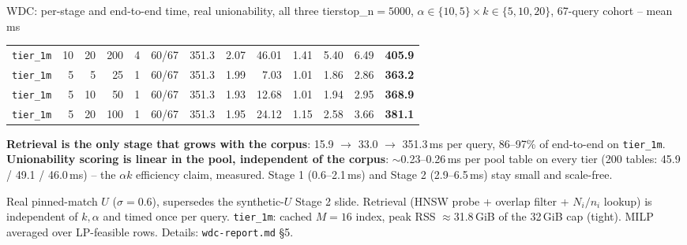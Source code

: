 \documentclass[aspectratio=169,10pt]{beamer}
\newcommand{\highlight}[1]{{\color{Cat1}\bfseries #1}}
\begin{document}
\begin{frame}{WDC: per-stage and end-to-end time, real unionability, all three tiers}{top\_n$=5000$, $\alpha\in\{10,5\}\times k\in\{5,10,20\}$, 67-query cohort -- mean ms}
\begin{center}
\begin{tabular}{lrrrrrrrrrrrr}
\texttt{tier\_1m} & 10 & 20 & 200 & 4 & 60/67 & 351.3 & 2.07 & 46.01 & 1.41 & 5.40 & 6.49 & \textbf{405.9} \\
\texttt{tier\_1m} & 5 & 5 & 25 & 1 & 60/67 & 351.3 & 1.99 & 7.03 & 1.01 & 1.86 & 2.86 & \textbf{363.2} \\
\texttt{tier\_1m} & 5 & 10 & 50 & 1 & 60/67 & 351.3 & 1.93 & 12.68 & 1.01 & 1.94 & 2.95 & \textbf{368.9} \\
\texttt{tier\_1m} & 5 & 20 & 100 & 1 & 60/67 & 351.3 & 1.95 & 24.12 & 1.15 & 2.58 & 3.66 & \textbf{381.1} \\
\bottomrule
\end{tabular}
\end{center}

\vspace{3pt}
\footnotesize
\highlight{Retrieval is the only stage that grows with the corpus}: 15.9 $\to$ 33.0 $\to$ 351.3\,ms per query, 86--97\% of end-to-end on \texttt{tier\_1m}. \highlight{Unionability scoring is linear in the pool, independent of the corpus}: $\sim$0.23--0.26\,ms per pool table on every tier (200 tables: 45.9 / 49.1 / 46.0\,ms) -- the $\alpha k$ efficiency claim, measured. Stage 1 (0.6--2.1\,ms) and Stage 2 (2.9--6.5\,ms) stay small and scale-free.

\vspace{1pt}
{\footnotesize\color{Muted} Real pinned-match $U$ ($\sigma{=}0.6$), supersedes the synthetic-$U$ Stage 2 slide. Retrieval (HNSW probe + overlap filter + $N_i/n_i$ lookup) is independent of $k,\alpha$ and timed once per query. \texttt{tier\_1m}: cached $M{=}16$ index, peak RSS $\approx$31.8\,GiB of the 32\,GiB cap (tight). MILP averaged over LP-feasible rows. Details: \texttt{wdc-report.md} \S5.}
\end{frame}
\end{document}

